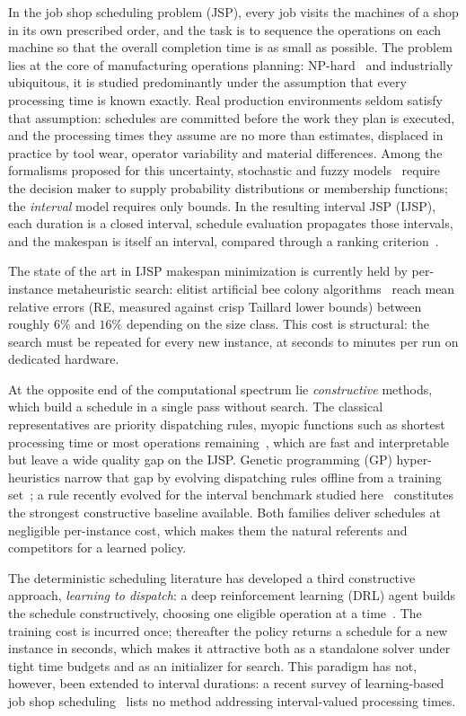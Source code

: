 \documentclass[preprint,12pt]{elsarticle}
\theoremstyle{definition}
\theoremstyle{remark}
\begin{document}
In the job shop scheduling problem (JSP), every job visits the
machines of a shop in its own prescribed order, and the task is to
sequence the operations on each machine so that the overall
completion time is as small as possible. The
problem lies at the core of manufacturing operations planning:
NP-hard~\citep{GareyJohnson1976}
and industrially ubiquitous, it is studied predominantly under the
assumption that every processing time is known exactly. Real
production environments seldom satisfy that assumption: schedules are
committed before the work they plan is executed, and the processing
times they assume are no more than estimates, displaced in practice
by tool wear, operator variability and material differences. Among
the formalisms proposed for this uncertainty, stochastic and fuzzy
models~\citep{GonzalezRodriguez2010} require the decision maker to
supply probability distributions or membership functions; the
\emph{interval} model requires only bounds. In the resulting
interval JSP (IJSP), each duration is a closed interval, schedule
evaluation propagates those intervals, and the makespan is itself an
interval, compared through a ranking criterion~\citep{Lei2011,
DiazICAE2023}.

The state of the art in IJSP makespan minimization is currently
held by per-instance metaheuristic search: elitist artificial bee colony
algorithms~\citep{DiazFEABC2023,DiazICAE2023} reach mean relative
errors (RE, measured against crisp Taillard lower bounds) between
roughly $6\%$ and $16\%$ depending on the size class. This cost is structural: the search must
be repeated for every new instance, at seconds to minutes per run on
dedicated hardware.

At the opposite end of the computational spectrum lie
\emph{constructive} methods, which build a schedule in a single pass
without search. The classical representatives are priority dispatching
rules, myopic functions such as shortest processing time or most
operations remaining~\citep{Panwalkar1977,Haupt1989}, which are fast
and interpretable but leave a wide quality gap on the IJSP. Genetic
programming (GP) hyper-heuristics narrow that gap by evolving
dispatching rules offline from a training
set~\citep{Branke2016,Nguyen2017}; a rule recently evolved for the
interval benchmark studied here~\citep{DiazGP2026} constitutes the
strongest constructive baseline available. Both families deliver
schedules at negligible per-instance cost, which makes them the
natural referents and competitors for a learned policy.

The deterministic scheduling literature has developed a third
constructive approach, \emph{learning to dispatch}: a deep
reinforcement learning (DRL) agent builds the schedule constructively,
choosing one eligible operation at a
time~\citep{Zhang2020L2D,Park2021GNN,Tassel2021}. The
training cost is incurred once; thereafter the policy returns a
schedule for a new instance in seconds, which makes it attractive both
as a standalone solver under tight time budgets and as an initializer
for search. This paradigm has not, however, been extended to interval
durations: a recent survey of
learning-based job shop scheduling~\citep{Xu2025} lists no method
addressing interval-valued processing times.
\end{document}

